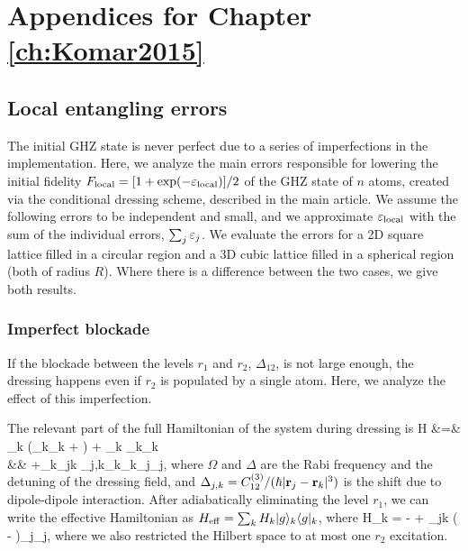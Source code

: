 \chapter{Appendices for Chapter \ref{ch:Komar2015}}
\label{app:Komar2015}


\section{Local entangling errors}
\label{app:local_entanging_errors}
The initial GHZ state is never perfect due to a series of imperfections in the
implementation. Here, we analyze the main errors responsible for lowering the
initial fidelity $F_\mathrm{local} = [1+\exp(-\varepsilon_\mathrm{local})]/2$ of the GHZ
state of $n$ atoms, created via the conditional dressing scheme,  described in
the main article. We assume the following errors to be independent and small,
and we approximate $\varepsilon_\mathrm{local}$ with the sum
of the individual errors, $\sum_j \varepsilon_j$. We evaluate the errors for a 2D
square lattice filled in a circular region and a 3D cubic lattice filled in a
spherical region (both of radius $R$). Where there is
a difference between the two cases, we give both results.
 
\subsection{Imperfect blockade}
\label{sec:imperfect_blockade}
If the blockade between the levels $r_1$ and $r_2$, $\Delta_{12}$, is not large
enough, the dressing happens even if $r_2$ is populated by a single
atom. Here, we analyze the effect of this imperfection.

The relevant part of the full Hamiltonian of the system during dressing is
\bal
	H &=& \sum_k \left(_k_k + \right)
	+ \Delta\sum_k _k_k \\
	&& +\sum_k\sum_{j\neq k}
	\Delta_{j,k}_k_k_j_j,
\eal
where $\Omega$ and $\Delta$ are the Rabi frequency and the detuning of the
dressing field, and $\Delta_{j,k} = C_{12}^{(3)}/(\hbar |{\mathbf r}_j - {\mathbf r}_k|^3)$ is
the shift due to dipole-dipole interaction. 
After adiabatically eliminating the level $r_1$, we can write the effective
Hamiltonian as $H_\mathrm{eff} = \sum_k H_k | g \rangle_k\langle g |_k$, where
\bel
	H_k = - + \sum_{j\neq k}
	\left( - \right)_j_j,
\eel
where we also restricted the Hilbert space to at most one $r_2$ excitation.

